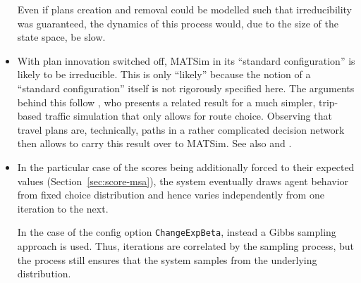 \begin{itemize}
Even if plans creation and removal could be modelled such that irreducibility was guaranteed, the dynamics of this process would, due to the size of the state space, be slow.



\item With plan innovation switched off, 
MATSim in its {}``standard configuration'' is likely to 
be irreducible.  This is only {}``likely'' because the notion of a {}``standard
configuration'' itself is not rigorously specified here. The arguments
behind this follow \citet{cascetta-1989}, who presents a related
result for a much simpler, trip-based traffic simulation that only
allows for route choice. Observing that travel plans are, technically,
paths in a rather complicated decision network then allows to carry
this result over to MATSim. See also \citet{NagelEtc2000tristan-succ} and \citep{floetteroed-2010e}.


\item In the particular case of the scores being additionally forced to their expected values (Section~\ref{sec:score-msa}), the system eventually draws agent behavior from fixed choice distribution and hence varies independently from one iteration to the next.

In the case of the config option \lstinline|ChangeExpBeta|, instead a Gibbs sampling approach is used.  Thus, iterations are correlated by the sampling process, but the process still ensures that the system samples from the underlying distribution.

\end{itemize}


